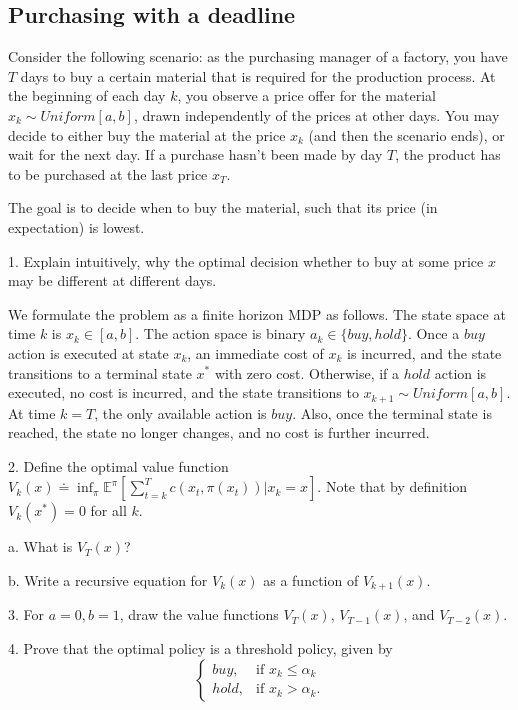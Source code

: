 \subsection{Purchasing with a deadline}
Consider the following scenario: as the purchasing manager of a factory, you have $T$ days to buy a certain material that is required for the production process. At the beginning of each day $k$, you observe a price offer for the material $x_k \sim \mathit{Uniform}[a,b]$, drawn independently of the prices at other days. You may decide to either buy the material at the price $x_k$ (and then the scenario ends), or wait for the next day. If a purchase hasn't been made by day $T$, the product has to be purchased at the last price $x_T$.

The goal is to decide when to buy the material, such that its price (in expectation) is lowest.

1. Explain intuitively, why the optimal decision whether to buy at some price $x$ may be different at different days.

We formulate the problem as a finite horizon MDP as follows. The state space at time $k$ is $x_k\in [a,b]$. The action space is binary $a_k \in \{buy,hold\}$. Once a $buy$ action is executed at state $x_k$, an immediate cost of $x_k$ is incurred, and the state transitions to a terminal state $x^*$ with zero cost. Otherwise, if a   $hold$ action is executed, no cost is incurred, and the state transitions to $x_{k+1} \sim \mathit{Uniform}[a,b]$. At time $k=T$, the only available action is $buy$. Also, once the terminal state is reached, the state no longer changes, and no cost is further incurred.

2. Define the optimal value function $V_k(x) \doteq \inf_\pi \mathbb{E}^\pi \left[ \sum_{t=k}^{T} c(x_t,\pi(x_t)) | x_k = x\right]$. Note that by definition $V_k(x^*)=0$ for all $k$.


\quad a. What is $V_T(x)$?

\quad b. Write a recursive equation for $V_k(x)$ as a function of  $V_{k+1}(x)$.

3. For $a=0,b=1$, draw the value functions $V_T(x)$, $V_{T-1}(x)$, and $V_{T-2}(x)$.

4. Prove that the optimal policy is a threshold policy, given by
\begin{equation*}
\left\{
  \begin{array}{ll}
    buy, & \text{if } x_k \leq \alpha_k \\
    hold, & \text{if } x_k > \alpha_k.
  \end{array}
\right.
\end{equation*}

